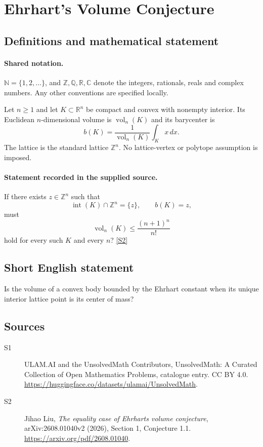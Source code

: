 \documentclass[11pt]{article}
\newcommand{\sref}[2]{\hyperlink{source:#1:#2}{[S#2]}}
\begin{document}
\section{Ehrhart's Volume Conjecture}\label{statement}

\subsection{Definitions and mathematical statement}

\paragraph{Shared notation.}$\mathbb N=\{1,2,\ldots\}$, and $\mathbb Z,\mathbb Q,\mathbb R,\mathbb C$ denote the integers, rationals, reals and complex numbers. Any other conventions are specified locally.


Let $n\geq1$ and let $K\subset\mathbb R^n$ be compact and convex with nonempty interior. Its Euclidean $n$-dimensional volume is $\operatorname{vol}_n(K)$ and its barycenter is
\[
b(K)=\frac{1}{\operatorname{vol}_n(K)}\int_Kx\,dx.
\]
The lattice is the standard lattice $\mathbb Z^n$. No lattice-vertex or polytope assumption is imposed.
\paragraph{Statement recorded in the supplied source.}
If there exists $z\in\mathbb Z^n$ such that
\[
\operatorname{int}(K)\cap\mathbb Z^n=\{z\},\qquad b(K)=z,
\]
must
\[
\operatorname{vol}_n(K)\leq\frac{(n+1)^n}{n!}
\]
hold for every such $K$ and every $n$? \sref{statement}{2}

\subsection{Short English statement}
Is the volume of a convex body bounded by the Ehrhart constant when its unique interior lattice point is its center of mass?
\subsection{Sources}
\begin{description}
\item[\hypertarget{source:statement:1}{S1}] ULAM.AI and the UnsolvedMath Contributors, UnsolvedMath: A Curated Collection of Open Mathematics Problems, catalogue entry. CC BY 4.0. \url{https://huggingface.co/datasets/ulamai/UnsolvedMath}.
\item[\hypertarget{source:statement:2}{S2}] Jihao Liu, \emph{The equality case of Ehrhart\textquotesingle s volume conjecture}, arXiv:2608.01040v2 (2026), Section 1, Conjecture 1.1. \url{https://arxiv.org/pdf/2608.01040}.
\end{description}
\label{end:statement}
\end{document}
